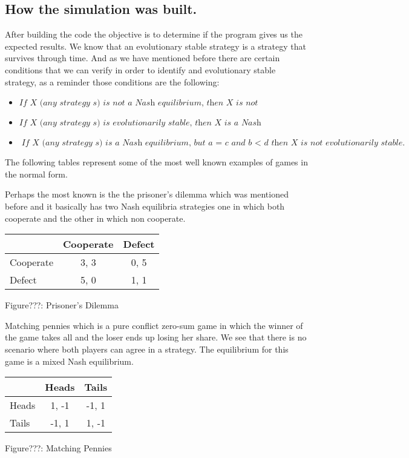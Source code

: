 \documentclass{article}
\begin{document}
\subsection{How the simulation was built.}
After building the code the objective is to determine if the program gives us the expected results. We know that an evolutionary stable strategy is a strategy that survives through time. And as we have mentioned before there are certain conditions that we can verify in order to identify and evolutionary stable strategy, as a reminder those conditions are the following:

\begin{itemize}
\item $\textit{If X (any strategy s) is not a Nash equilibrium, then X is not evolutionarily stable.}$ 
\item $\textit{If X (any strategy s) is evolutionarily stable, then X is a Nash equilibrium.}$ 
\item $\textit{If X (any strategy s) is a Nash equilibrium, but  $\textit{a = c and b $<$ d}$ then X is not evolutionarily stable.}$
\end{itemize}

The following tables represent some of the most well known examples of games in the normal form. 

Perhaps the most known is the the prisoner's dilemma which was mentioned before and it basically has two Nash equilibria strategies one in which both cooperate and the other in which non cooperate.
\begin{center}
\begin{tabular}{|l|c|c|}
\hline
 & Cooperate & Defect \\ 
\hline
Cooperate & 3, 3 & 0, 5\\
\hline
 Defect & 5, 0 & 1, 1\\
\hline
\end{tabular}
\end{center}
\begin{center}
	Figure???: Prisoner's Dilemma
\end{center}


Matching pennies which is a pure conflict zero-sum game in which the winner of the game takes all and the loser ends up losing her share. We see that there is no scenario where both players can agree in a strategy. The equilibrium for this game is a mixed Nash equilibrium.
\begin{center}
\begin{tabular}{|l|c|c|}
\hline
 & Heads & Tails \\ 
\hline
Heads & 1, -1 & -1, 1\\
\hline
 Tails & -1, 1 & 1, -1\\
\hline
\end{tabular}
\end{center}
\begin{center}
	Figure???: Matching Pennies
\end{center}
\end{document}
